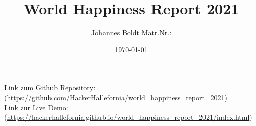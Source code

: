 \subject{Projektbericht zum Modul Information Retrieval und Visualisierung Sommersemester 2022}
\title{World Happiness Report 2021}
\author{Johannes Boldt Matr.Nr.:}%
\date{\today}
\maketitle%
\vspace{12cm}
\begin{centering}

\hline
\vspace{0.5cm}
Link zum Github Repository: \\
(\href{https://github.com/HackerHallefornia/world_happiness_report_2021}{https://github.com/HackerHallefornia/world\_happiness\_report\_2021}) \\

Link zur Live Demo: \\
(\href{https://hackerhallefornia.github.io/world_happiness_report_2021/index.html}{https://hackerhallefornia.github.io/world\_happiness\_report\_2021/index.html})
    
\end{centering}
\clearpage

